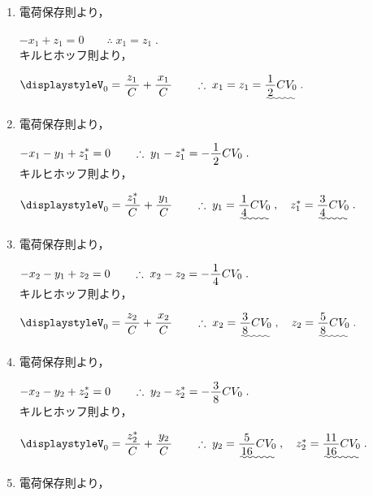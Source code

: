 ﻿\documentclass[../../../ps_a.tex]{subfiles}
\begin{document}
    \begin{enumerate}
        \item 電荷保存則より，
            
            \myspaceb%
            $\displaystyle%
                -x_1 + z_1 = 0%
                \qquad \therefore \; x_1 = z_1 \;.
            $\\
            キルヒホッフ則より，
            
            \myspaceb%
            $\displaystyle%
                V_0 = \myfracc{z_1}{C} + \myfracc{x_1}{C}%
                \qquad \therefore \; x_1 = z_1 = \uwave{\myfraca{1}{2}CV_0} \;.
            $
        \item 電荷保存則より，
            
            \myspaceb%
            $\displaystyle%
                -x_1 - y_1+ z^*_1 = 0%
                \qquad \therefore \; y_1 - z^*_1 = -\myfraca{1}{2}CV_0  \;.
            $\\
            キルヒホッフ則より，
            
            \myspaceb%
            $\displaystyle%
                V_0 = \myfracc{z^*_1}{C} + \myfracc{y_1}{C}%
                \qquad \therefore \; y_1 = \uwave{\myfraca{1}{4}CV_0} \;,%
                \quad z^*_1 = \uwave{\myfraca{3}{4}CV_0} \;.
            $
        \item 電荷保存則より，
            
            \myspaceb%
            $\displaystyle%
                -x_2 - y_1 + z_2 = 0%
                \qquad \therefore \; x_2 - z_2 = -\myfraca{1}{4}CV_0 \;.
            $\\
            キルヒホッフ則より，
            
            \myspaceb%
            $\displaystyle%
                V_0 = \myfracc{z_2}{C} + \myfracc{x_2}{C}%
                \qquad \therefore \; x_2 = \uwave{\myfraca{3}{8}CV_0} \;,%
                \quad z_2 = \uwave{\myfraca{5}{8}CV_0} \;.
            $
        \item 電荷保存則より，
            
            \myspaceb%
            $\displaystyle%
                -x_2 - y_2 + z^*_2 = 0%
                \qquad \therefore \; y_2 - z^*_2 = -\myfraca{3}{8}CV_0 \;.
            $\\
            キルヒホッフ則より，
            
            \myspaceb%
            $\displaystyle%
                V_0 = \myfracc{z^*_2}{C} + \myfracc{y_2}{C}%
                \qquad \therefore \; y_2 = \uwave{\myfraca{5}{16}CV_0} \;,%
                \quad z^*_2 = \uwave{\myfraca{11}{16}CV_0} \;.
            $
        \item 電荷保存則より，
            

\end{enumerate}
\end{document}
